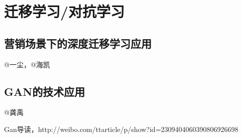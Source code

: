 
\chapter{迁移学习/对抗学习}
\thispagestyle{empty}

\setlength{\fboxrule}{0pt}\setlength{\fboxsep}{0cm}
\noindent\shadowbox{
\begin{tcolorbox}[arc=0mm,colback=lightblue,colframe=darkblue,title=学习目标与要求]

\end{tcolorbox}}
\setlength{\fboxrule}{1pt}\setlength{\fboxsep}{4pt} 


\section{营销场景下的深度迁移学习应用} 
	@一尘，@海凯 

\section{GAN的技术应用} 



	@龚禹 


\begin{thebibliography}{99}
 Gan导读，http://weibo.com/ttarticle/p/show?id=2309404060390806926698
\end{thebibliography}

 
